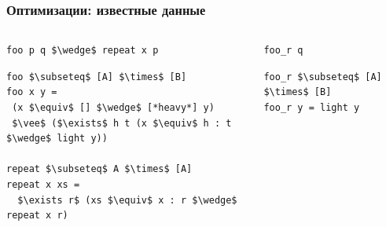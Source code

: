 \documentclass{beamer}
\begin{document}
\begin{frame}[fragile]
  \transwipe[direction=90]
  \frametitle{Оптимизации: известные данные}
\begin{columns}
\begin{column}{7cm}
\begin{badcode}
\begin{lstlisting}[frame=single]      
foo p q $\wedge$ repeat x p
\end{lstlisting}

\begin{lstlisting}[frame=single]  
foo $\subseteq$ [A] $\times$ [B]
foo x y = 
 (x $\equiv$ [] $\wedge$ [*heavy*] y)
 $\vee$ ($\exists$ h t (x $\equiv$ h : t $\wedge$ light y))
      
repeat $\subseteq$ A $\times$ [A]
repeat x xs = 
  $\exists r$ (xs $\equiv$ x : r $\wedge$ repeat x r)
\end{lstlisting}
\end{badcode}
\end{column}

\pause

\begin{column}{4cm}
\begin{goodcode}
\begin{lstlisting}[frame=single]  
foo_r q
\end{lstlisting}

\begin{lstlisting}[frame=single]  
foo_r $\subseteq$ [A] $\times$ [B]
foo_r y = light y
\end{lstlisting}
\end{goodcode}
\end{column}
\end{columns}
\end{frame}
\end{document}
